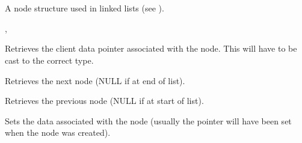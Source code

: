 \section{}\label{wxnode}

A node structure used in linked lists (see ).




, 




Retrieves the client data pointer associated with the node. This will
have to be cast to the correct type.



Retrieves the next node (NULL if at end of list).



Retrieves the previous node (NULL if at start of list).



Sets the data associated with the node (usually the pointer will have been
set when the node was created).


